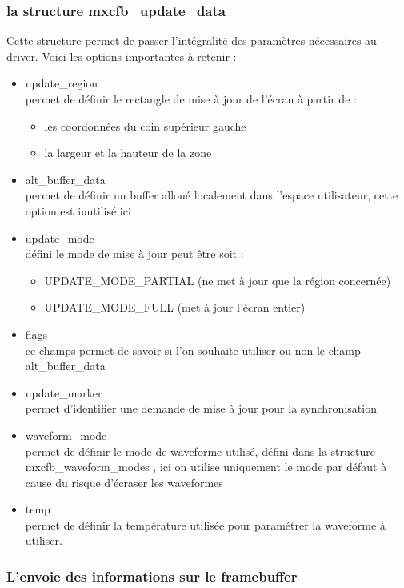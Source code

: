 \subsubsection{la structure mxcfb_update_data}
Cette structure permet de passer l'intégralité des paramètres nécessaires au driver.
Voici les options importantes à retenir : 
\begin{itemize}
	\renewcommand{\labelitemi}{$\bullet$}
	\item update_region \\
		permet de définir le rectangle de mise à jour de l'écran à partir de :
		\begin{itemize}
			\item les coordonnées du coin supérieur gauche
			\item la largeur et la hauteur de la zone
		\end{itemize}
	\item alt_buffer_data\\
		permet de définir un buffer alloué localement dans l'espace utilisateur, 
		cette option est inutilisé ici
		
	\item update_mode \\
		défini le mode de mise à jour peut être soit :
		\begin{itemize}
			\item UPDATE_MODE_PARTIAL (ne met à jour que la région concernée)
			\item UPDATE_MODE_FULL (met à jour l'écran entier)
		\end{itemize}
	\item flags\\
		ce champs permet de savoir si l'on souhaite utiliser ou non le champ alt_buffer_data
	\item update_marker\\
		permet d'identifier une demande de mise à jour pour la synchronisation
	\item waveform_mode \\
		permet de définir le mode de waveforme utilisé, défini dans la structure
		mxcfb_waveform_modes , ici on utilise uniquement le mode par défaut à cause du risque 
		d'écraser les waveformes
	\item temp\\
		permet de définir la température utilisée pour paramétrer la waveforme à utiliser.
	
\end{itemize}

\subsubsection{L'envoie des informations sur le framebuffer}


